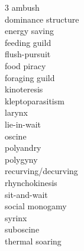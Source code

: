 
\begin{multicols}{3}
ambush \\
dominance structure \\
energy saving \\
feeding guild \\
flush-pursuit \\
food piracy \\
foraging guild \\
kinoteresis \\
kleptoparasitism \\
larynx \\
lie-in-wait \\
oscine \\
polyandry \\
polygyny \\
recurving/decurving \\
rhynchokinesis \\
sit-and-wait \\
social monogamy \\
syrinx \\
suboscine \\
thermal soaring
\end{multicols}
